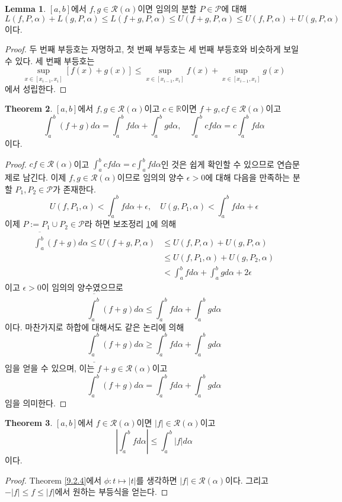\documentclass[11pt]{book}
\numberwithin{equation}{chapter}
\def\RR{\mathbb{R}}
\def\eps{\epsilon}
\def\calP{\mathcal{P}}
\def\calR{\mathcal{R}}
\newcommand{\abs}[1]{\left\vert#1\right\vert}
\newcommand{\lowint}[2]{\underline{\int_{#1}^{#2}}}
\newcommand{\upint}[2]{\overline{\int_{#1}^{#2}}}
\theoremstyle{definition}
\newtheorem{thm}{Theorem}[section]
\newtheorem{lem}[thm]{Lemma}
\begin{document}
\begin{lem} \label{9.3.2}
    \([a, b]\)에서 \(f, g \in \calR(\alpha)\)이면 임의의 분할 \(P \in \calP\)에 대해
    \[
        L(f, P, \alpha) + L(g, P, \alpha) \le L(f+g, P, \alpha) \le U(f+g, P, \alpha) \le U(f, P, \alpha) + U(g, P, \alpha)
    \]
    이다.
\end{lem}
\begin{proof}
    두 번째 부등호는 자명하고, 첫 번째 부등호는 세 번째 부등호와 비슷하게 보일 수 있다. 세 번째 부등호는
    \[
        \sup_{x \in [x_{i-1}, x_i]} [f(x) + g(x)] \le \sup_{x \in [x_{i-1}, x_i]} f(x) + \sup_{x \in [x_{i-1}, x_i]} g(x)
    \]
    에서 성립한다.
\end{proof}

\begin{thm} \label{9.3.3}
    \([a, b]\)에서 \(f, g \in \calR(\alpha)\)이고 \(c \in \RR\)이면 \(f + g, cf \in \calR(\alpha)\)이고
    \[
        \int_a^b (f+g) d\alpha = \int_a^b f d\alpha + \int_a^b g d\alpha, \quad \int_a^b cf d\alpha = c \int_a^b f d\alpha
    \]
    이다.
\end{thm}
\begin{proof}
    \(cf \in \calR(\alpha)\)이고 \(\displaystyle \int_a^b cf d\alpha = c \int_a^b f d\alpha\)인 것은 쉽게 확인할 수 있으므로 연습문제로 남긴다. 이제 \(f, g \in \calR(\alpha)\)이므로 임의의 양수 \(\eps > 0\)에 대해 다음을 만족하는 분할 \(P_1, P_2 \in \calP\)가 존재한다.
    \[
        U(f, P_1, \alpha)  < \int_a^b f d\alpha +  \eps, \quad U(g, P_1, \alpha) < \int_a^b f d\alpha + \eps
    \]
    이제 \(P := P_1 \cup P_2 \in \calP\)라 하면 보조정리 \ref{9.3.2}에 의해
    \begin{align*}
        \upint{a}{b} (f+g) d\alpha \le U(f+g, P, \alpha) &\le U(f, P, \alpha) + U(g, P, \alpha)\\
        &\le U(f, P_1, \alpha) + U(g, P_2, \alpha)\\
        &< \int_a^b f d\alpha + \int_a^b g d\alpha + 2\eps
    \end{align*}
    이고 \(\eps > 0\)이 임의의 양수였으므로
    \[
        \upint{a}{b} (f+g) d\alpha \le \int_a^b f d\alpha + \int_a^b g d\alpha
    \]
    이다. 마찬가지로 하합에 대해서도 같은 논리에 의해
    \[
        \lowint{a}{b} (f+g) d\alpha \ge \int_a^b f d\alpha + \int_a^b g d\alpha
    \]
    임을 얻을 수 있으며, 이는 \(f+g \in \calR(\alpha)\)이고
    \[
        \int_a^b (f+g) d\alpha = \int_a^b f d\alpha + \int_a^b g d\alpha
    \]
    임을 의미한다.
\end{proof}

\begin{thm} 
    \([a, b]\)에서 \(f \in \calR(\alpha)\)이면 \(\abs{f} \in \calR(\alpha)\)이고
    \[
        \abs{\int_a^b f d\alpha} \le \int_a^b \abs{f} d \alpha
    \]
    이다.
\end{thm}
\begin{proof}
    Theorem \ref{9.2.4}에서 \(\phi : t \mapsto \abs{t}\)를 생각하면 \(\abs{f} \in \calR(\alpha)\)이다. 그리고 \(-\abs{f} \le f \le \abs{f}\)에서 원하는 부등식을 얻는다.
\end{proof}
\end{document}
